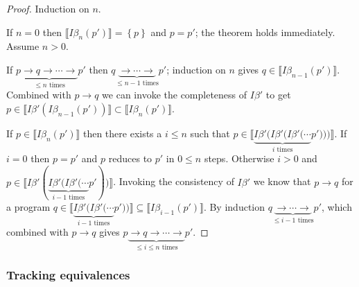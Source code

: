 \documentclass{article}
\newcommand{\denotation}[1]{{\llbracket #1 \rrbracket}}
\newcommand{\code}[1]{{\footnotesize\texttt{#1}}}
\newcommand{\shift}[1]{\uparrow^{#1}}
\newcommand{\reduce}{\longrightarrow}
\newtheorem{theorem}{Theorem}
\begin{document}
\begin{proof}
  Induction on $n$.

  If $n = 0$
  then $\denotation{I\beta_n(p')} = \left\{p \right\}$
  and $p = p'$;
  the theorem holds immediately. Assume $n > 0$.
  
  If $p\underbrace{\reduce q\reduce\cdots\reduce}_{\text{$\leq n$ times}} p'$
  then $q\underbrace{\reduce\cdots\reduce}_{\text{$\leq n - 1$ times}} p'$;
  induction on $n$
  gives $q\in \denotation{I\beta_{n - 1}(p')}$.
  Combined with $p\reduce q$ we can invoke the completeness of $I\beta'$
  to get $p\in \denotation{I\beta'(I\beta_{n - 1}(p'))}\subset\denotation{I\beta_n(p')}$.
  
  If $p\in \denotation{I\beta_n(p')}$
  then
  there exists a $i\leq n$
  such that $p\in \denotation{\underbrace{I\beta'(I\beta'(I\beta'(\cdots}_{i \text{ times}} p')))}$.
  If $i = 0$
  then $p = p'$ and $p$ reduces to $p'$ in $0\leq n$ steps.
  Otherwise $i > 0$
  and $p\in \denotation{I\beta'(\underbrace{I\beta'(I\beta'(\cdots}_{i - 1 \text{ times}} p'))}$.
  Invoking the
  consistency of $I\beta'$
  we know that $p\reduce q$
  for a program $q\in \denotation{\underbrace{I\beta'(I\beta'(\cdots}_{i - 1 \text{ times}} p'))}\subseteq\denotation{I\beta_{i - 1}(p')}$.
  By induction $q\underbrace{\reduce\cdots\reduce}_{\text{$\leq i - 1$ times}} p'$,
  which combined with $p\reduce q$
  gives  $p\underbrace{\reduce q\reduce\cdots\reduce}_{\text{$\leq i\leq n$ times}} p'$.  
\end{proof}

\subsubsection{Tracking equivalences}

\end{document}

